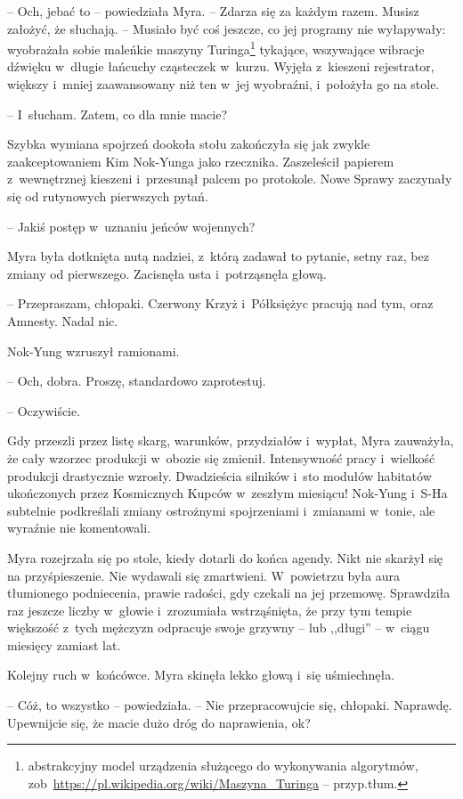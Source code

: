 \documentclass[oneside,polish,11pt,sfheadings]{mwbk}
\begin{document}
-- Och, jebać to -- powiedziała Myra. -- Zdarza się za każdym razem. Musisz
założyć, że słuchają. -- Musiało być coś jeszcze, co jej programy nie
wyłapywały: wyobrażała sobie maleńkie maszyny Turinga\footnote{ abstrakcyjny
model urządzenia służącego do wykonywania algorytmów,
zob~\url{https://pl.wikipedia.org/wiki/Maszyna\_Turinga} -- przyp.tłum.} tykające, wszywające wibracje dźwięku w~długie łańcuchy
cząsteczek w~kurzu. Wyjęła z~kieszeni rejestrator, większy i~mniej
zaawansowany niż ten w~jej wyobraźni, i~położyła go na stole. 

-- I~słucham. Zatem, co dla mnie macie?

Szybka wymiana spojrzeń dookoła stołu zakończyła się jak zwykle
zaakceptowaniem Kim Nok-Yunga jako rzecznika. Zaszeleścił papierem z~wewnętrznej kieszeni i~przesunął palcem po protokole. Nowe Sprawy
zaczynały się od rutynowych pierwszych pytań.

-- Jakiś postęp w~uznaniu jeńców wojennych?

Myra była dotknięta nutą nadziei, z~którą zadawał to pytanie, setny raz,
bez zmiany od pierwszego. Zacisnęła usta i~potrząsnęła głową. 

-- Przepraszam, chłopaki. Czerwony Krzyż i~Półksiężyc pracują nad tym, oraz
Amnesty. Nadal nic.

Nok-Yung wzruszył ramionami. 

-- Och, dobra. Proszę, standardowo
zaprotestuj.

-- Oczywiście.

Gdy przeszli przez listę skarg, warunków, przydziałów i~wypłat, Myra
zauważyła, że cały wzorzec produkcji w~obozie się zmienił. Intensywność
pracy i~wielkość produkcji drastycznie wzrosły. Dwadzieścia silników i~sto modułów habitatów ukończonych przez Kosmicznych Kupców w~zeszłym
miesiącu! Nok-Yung i~S-Ha subtelnie podkreślali zmiany ostrożnymi
spojrzeniami i~zmianami w~tonie, ale wyraźnie nie komentowali.

Myra rozejrzała się po stole, kiedy dotarli do końca agendy. Nikt nie
skarżył się na przyśpieszenie. Nie wydawali się zmartwieni. W~powietrzu
była aura tłumionego podniecenia, prawie radości, gdy czekali na jej
przemowę. Sprawdziła raz jeszcze liczby w~głowie i~zrozumiała
wstrząśnięta, że przy tym tempie większość z~tych mężczyzn odpracuje
swoje grzywny -- lub ,,długi'' -- w~ciągu miesięcy zamiast lat.

Kolejny ruch w~końcówce. Myra skinęła lekko głową i~się uśmiechnęła. 

-- Cóż, to wszystko -- powiedziała. -- Nie przepracowujcie się, chłopaki.
Naprawdę. Upewnijcie się, że macie dużo dróg do naprawienia, ok?
\end{document}
